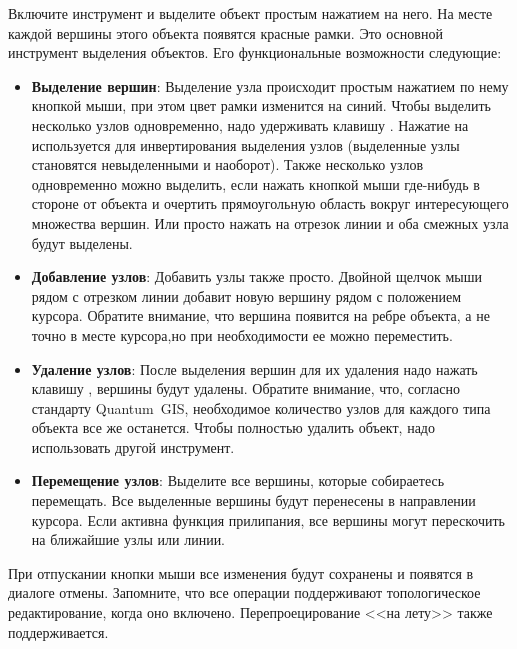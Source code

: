 
Включите инструмент  и
выделите объект простым нажатием на него. На месте каждой вершины этого
объекта появятся красные рамки. Это основной инструмент выделения объектов.
Его функциональные возможности следующие:

\begin{itemize}[label=--]
\item \textbf{Выделение вершин}: Выделение узла происходит простым нажатием
по нему кнопкой мыши, при этом цвет рамки изменится на синий. Чтобы выделить
несколько узлов одновременно, надо удерживать клавишу
. Нажатие на
 используется для инвертирования выделения узлов (выделенные
узлы становятся невыделенными и наоборот). Также несколько узлов одновременно
можно выделить, если нажать кнопкой мыши где-нибудь в стороне от объекта и
очертить прямоугольную область вокруг интересующего множества вершин. Или
просто нажать на отрезок линии и оба смежных узла будут выделены.
\item \textbf{Добавление узлов}: Добавить узлы также просто. Двойной щелчок
мыши рядом с отрезком линии добавит новую вершину рядом с положением курсора.
Обратите внимание, что вершина появится на ребре объекта, а не точно в
месте курсора,но при необходимости ее можно переместить.
\item \textbf{Удаление узлов}: После выделения вершин для их удаления надо
нажать клавишу , вершины будут удалены. Обратите внимание,
что, согласно стандарту Quantum~GIS, необходимое количество узлов для каждого
типа объекта все же останется. Чтобы полностью удалить объект, надо использовать
другой инструмент.
\item \textbf{Перемещение узлов}: Выделите все вершины, которые собираетесь
перемещать. Все выделенные вершины будут перенесены в направлении курсора.
Если активна функция прилипания, все вершины могут перескочить на
ближайшие узлы или линии.
\end{itemize}

При отпускании кнопки мыши все изменения будут сохранены и появятся в
диалоге отмены. Запомните, что все операции поддерживают топологическое
редактирование, когда оно включено. Перепроецирование <<на лету>> также
поддерживается.


